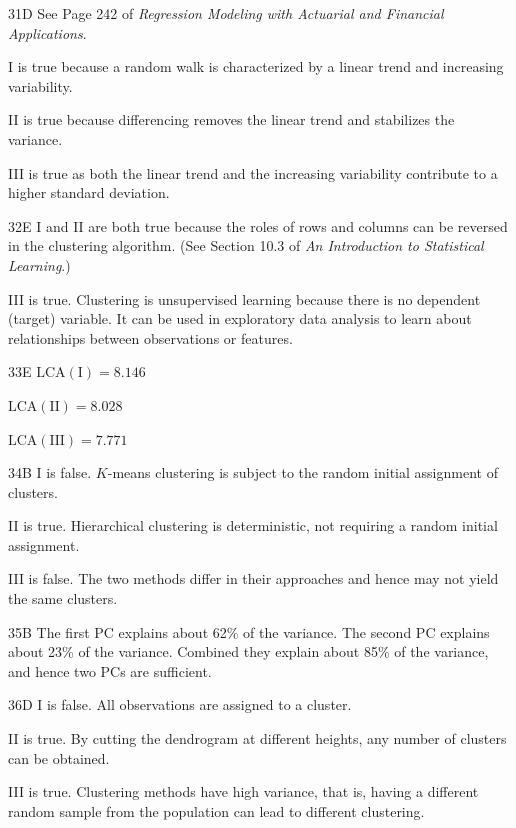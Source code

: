 \begin{solution}{31}{D}
See Page 242 of \textit{Regression Modeling with Actuarial and Financial Applications}.

I is true because a random walk is characterized by a linear trend and increasing variability.

II is true because differencing removes the linear trend and stabilizes the variance.

III is true as both the linear trend and the increasing variability contribute to a higher standard deviation.
\end{solution}

\begin{solution}{32}{E}
I and II are both true because the roles of rows and columns can be reversed in the clustering algorithm. (See Section 10.3 of \textit{An Introduction to Statistical Learning}.)

III is true. Clustering is unsupervised learning because there is no dependent (target) variable. It can be used in exploratory data analysis to learn about relationships between observations or features.
\end{solution}
\begin{solution}{33}{E}
$\mathrm{LCA(I)} = 8.146$

$\mathrm{LCA(II)} = 8.028$

$\mathrm{LCA(III)} = 7.771$
\end{solution}

\begin{solution}{34}{B}
I is false. $K$-means clustering is subject to the random initial assignment of clusters.

II is true. Hierarchical clustering is deterministic, not requiring a random initial assignment.

III is false. The two methods differ in their approaches and hence may not yield the same clusters.
\end{solution}

\begin{solution}{35}{B}
The first PC explains about 62\% of the variance. The second PC explains about 23\% of the variance. Combined they explain about 85\% of the variance, and hence two PCs are sufficient.
\end{solution}

\begin{solution}{36}{D}
I is false. All observations are assigned to a cluster.

II is true. By cutting the dendrogram at different heights, any number of clusters can be obtained.

III is true. Clustering methods have high variance, that is, having a different random sample from the population can lead to different clustering.
\end{solution}

